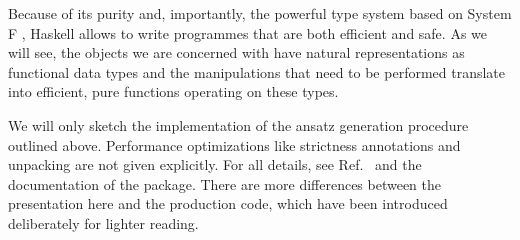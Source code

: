Because of its purity and, importantly, the powerful type system based on System F \cite{Girard_1972}, Haskell allows to write programmes that are both efficient and safe. As we will see, the objects we are concerned with have natural representations as functional data types and the manipulations that need to be performed translate into efficient, pure functions operating on these types.

We will only sketch the implementation of the ansatz generation procedure outlined above. Performance optimizations like strictness annotations and unpacking are not given explicitly. For all details, see Ref.\ \cite{Reinhart_2019} and the documentation \cite{Reinhart_2019_sparse-tensor} of the package. There are more differences between the presentation here and the production code, which have been introduced deliberately for lighter reading.

